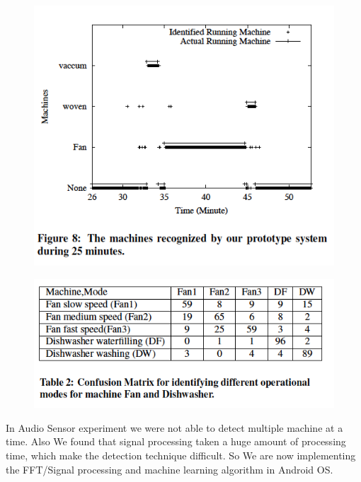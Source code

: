 \documentclass[11pt]{amsart}
\begin{document}
\begin{figure}[htb]
\begin{center}
\includegraphics[width=1.0\linewidth, angle = 0]{result2.png}
\label{fig:result2}
\end{center}
\end{figure}


\begin{figure}[htb]
\begin{center}
\includegraphics[width=1.0\linewidth, angle = 0]{result3.png}
\label{fig:result3}
\end{center}
\end{figure}

In Audio Sensor experiment we were not able to detect multiple machine at a time. Also We found that signal processing taken a huge amount of processing time, which make the detection technique difficult. So We are now implementing the FFT/Signal processing and machine learning algorithm in Android OS.
\end{document}
